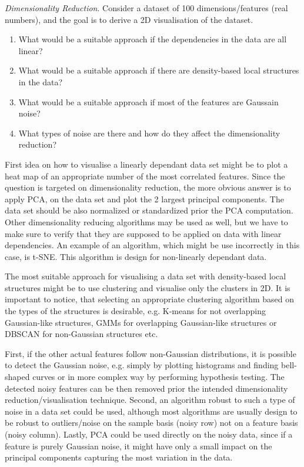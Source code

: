 \documentclass[a4paper,10pt]{article}\setlength{\textheight}{10in}\setlength{\textwidth}{6.5in}\setlength{\topmargin}{-0.125in}\setlength{\oddsidemargin}{-.2in}\setlength{\evensidemargin}{-.2in}\setlength{\headsep}{0.2in}\setlength{\footskip}{0pt}\usepackage{amsmath}\usepackage{fancyhdr}\usepackage{enumitem}\usepackage{hyperref}\usepackage{xcolor}\usepackage{graphicx}\pagestyle{fancy}
\begin{document}
\begin{enumerate}[topsep=0mm, partopsep=0mm, leftmargin=*]
{\color{blue}
\newpage\item\textit{Dimensionality Reduction}. Consider a dataset of 100 dimensions/features (real numbers), and the goal is to derive a 2D visualisation of the dataset. 
\begin{enumerate}
	\item What would be a suitable approach if the dependencies in the data are all linear?
	\item What would be a suitable approach if there are density-based local structures in the data?
	\item What would be a suitable approach if most of the features are Gaussain noise?
	\item What types of noise are there and how do they affect the dimensionality reduction?
\end{enumerate}
}

First idea on how to visualise a linearly dependant data set might be to plot a heat map of an appropriate number of the most correlated features. Since the question is targeted on dimensionality reduction, the more obvious answer is to apply PCA, on the data set and plot the 2 largest principal components. The data set should be also normalized or standardized prior the PCA computation. Other dimensionality reducing algorithms may be used as well, but we have to make sure to verify that they are supposed to be applied on data with linear dependencies. An example of an algorithm, which might be use incorrectly in this case, is t-SNE. This algorithm is design for non-linearly dependant data.

The most suitable approach for visualising a data set with density-based local structures might be to use clustering and visualise only the clusters in 2D. It is important to notice, that selecting an appropriate clustering algorithm based on the types of the structures is desirable, e.g. K-means for not overlapping Gaussian-like structures, GMMs for overlapping Gaussian-like structures or DBSCAN for non-Gaussian structures etc.

First, if the other actual features follow non-Gaussian distributions, it is possible to detect the Gaussian noise, e.g. simply by plotting histograms and finding bell-shaped curves or in more complex way by performing hypothesis testing. The detected noisy features can be then removed prior the intended dimensionality reduction/visualisation technique. Second, an algorithm robust to such a type of noise in a data set could be used, although most algorithms are usually design to be robust to outliers/noise on the sample basis (noisy row) not on a feature basis (noisy column). Lastly, PCA could be used directly on the noisy data, since if a feature is purely Gaussian noise, it might have only a small impact on the principal components capturing the most variation in the data.


\end{enumerate}
\end{document}
